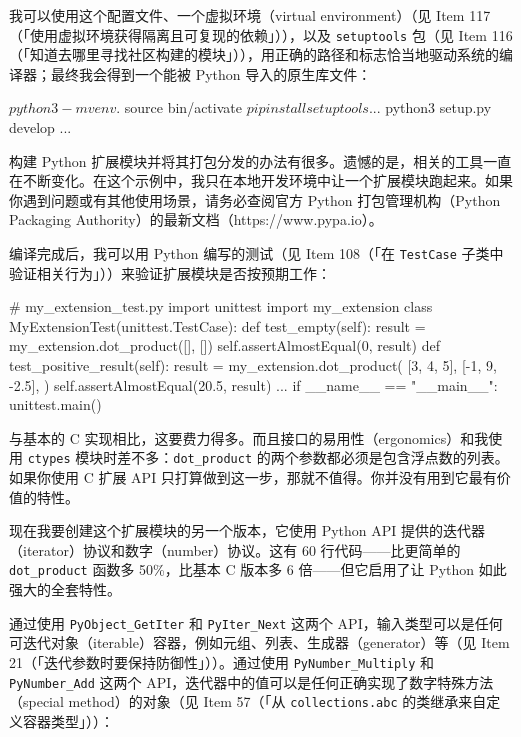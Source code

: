 我可以使用这个配置文件、一个虚拟环境（virtual environment）（见 Item 117（「使用虚拟环境获得隔离且可复现的依赖」）），以及 \texttt{setuptools} 包（见 Item 116（「知道去哪里寻找社区构建的模块」）），用正确的路径和标志恰当地驱动系统的编译器；最终我会得到一个能被 Python 导入的原生库文件：

\begin{codebox}[bash]
$ python3 -m venv .
$ source bin/activate
$ pip install setuptools
...
$ python3 setup.py develop
...
\end{codebox}

构建 Python 扩展模块并将其打包分发的办法有很多。遗憾的是，相关的工具一直在不断变化。在这个示例中，我只在本地开发环境中让一个扩展模块跑起来。如果你遇到问题或有其他使用场景，请务必查阅官方 Python 打包管理机构（Python Packaging Authority）的最新文档（https://www.pypa.io）。

编译完成后，我可以用 Python 编写的测试（见 Item 108（「在 \texttt{TestCase} 子类中验证相关行为」））来验证扩展模块是否按预期工作：

\begin{codebox}[python]
# my_extension_test.py
import unittest
import my_extension
class MyExtensionTest(unittest.TestCase):
    def test_empty(self):
        result = my_extension.dot_product([], [])
        self.assertAlmostEqual(0, result)
    def test_positive_result(self):
        result = my_extension.dot_product(
            [3, 4, 5],
            [-1, 9, -2.5],
        )
        self.assertAlmostEqual(20.5, result)
    ...
if __name__ == "__main__":
    unittest.main()
\end{codebox}

与基本的 C 实现相比，这要费力得多。而且接口的易用性（ergonomics）和我使用 \texttt{ctypes} 模块时差不多：\texttt{dot\_product} 的两个参数都必须是包含浮点数的列表。如果你使用 C 扩展 API 只打算做到这一步，那就不值得。你并没有用到它最有价值的特性。

现在我要创建这个扩展模块的另一个版本，它使用 Python API 提供的迭代器（iterator）协议和数字（number）协议。这有 60 行代码——比更简单的 \texttt{dot\_product} 函数多 50\%，比基本 C 版本多 6 倍——但它启用了让 Python 如此强大的全套特性。

通过使用 \texttt{PyObject\_GetIter} 和 \texttt{PyIter\_Next} 这两个 API，输入类型可以是任何可迭代对象（iterable）容器，例如元组、列表、生成器（generator）等（见 Item 21（「迭代参数时要保持防御性」））。通过使用 \texttt{PyNumber\_Multiply} 和 \texttt{PyNumber\_Add} 这两个 API，迭代器中的值可以是任何正确实现了数字特殊方法（special method）的对象（见 Item 57（「从 \texttt{collections.abc} 的类继承来自定义容器类型」））：

